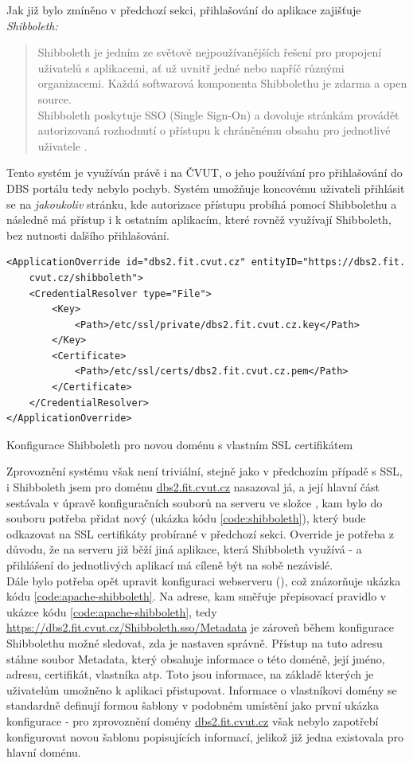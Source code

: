 Jak již bylo zmíněno v předchozí sekci, přihlašování do aplikace zajišťuje \emph{Shibboleth:}
\begin{quote}
Shibboleth je jedním ze světově nejpoužívanějších řešení pro propojení uživatelů s aplikacemi, ať už uvnitř jedné nebo napříč různými organizacemi. Každá softwarová komponenta Shibbolethu je zdarma a open source.\\
Shibboleth poskytuje SSO (Single Sign-On) a dovoluje stránkám provádět autorizovaná rozhodnutí o přístupu k chráněnému obsahu pro jednotlivé uživatele \cite{shibboleth}.
\end{quote}
Tento systém je využíván právě i na ČVUT, o jeho používání pro přihlašování do DBS portálu tedy nebylo pochyb. Systém umožňuje koncovému uživateli přihlásit se na \emph{jakoukoliv} stránku, kde autorizace přístupu probíhá pomocí Shibbolethu a následně má přístup i k ostatním aplikacím, které rovněž využívají Shibboleth, bez nutnosti dalšího přihlašování.\\
\begin{listing}[H]
	\begin{verbatim}
<ApplicationOverride id="dbs2.fit.cvut.cz" entityID="https://dbs2.fit.
    cvut.cz/shibboleth">
    <CredentialResolver type="File">
        <Key>
            <Path>/etc/ssl/private/dbs2.fit.cvut.cz.key</Path>
        </Key>
        <Certificate>
            <Path>/etc/ssl/certs/dbs2.fit.cvut.cz.pem</Path>
        </Certificate>
    </CredentialResolver>
</ApplicationOverride>
	\end{verbatim}
	\caption{Konfigurace Shibboleth pro novou doménu s vlastním SSL certifikátem} \label{code:shibboleth}
\end{listing}
Zprovoznění systému však není triviální, stejně jako v předchozím případě s SSL, i Shibboleth jsem pro doménu \url{dbs2.fit.cvut.cz} nasazoval já, a její hlavní část sestávala v úpravě konfiguračních souborů na serveru ve složce , kam bylo do souboru  potřeba přidat nový  (ukázka kódu \ref{code:shibboleth}), který bude odkazovat na SSL certifikáty probírané v předchozí sekci. Override je potřeba z důvodu, že na serveru již běží jiná aplikace, která Shibboleth využívá -  a přihlášení do jednotlivých aplikací má cíleně být na sobě nezávislé.\\
Dále bylo potřeba opět upravit konfiguraci webserveru (), což znázorňuje ukázka kódu \ref{code:apache-shibboleth}. Na adrese, kam směřuje přepisovací pravidlo v ukázce kódu \ref{code:apache-shibboleth}, tedy \url{https://dbs2.fit.cvut.cz/Shibboleth.sso/Metadata} je zároveň během konfigurace Shibbolethu možné sledovat, zda je nastaven správně. Přístup na tuto adresu stáhne soubor Metadata, který obsahuje informace o této doméně, její jméno, adresu, certifikát, vlastníka atp. Toto jsou informace, na základě kterých je uživatelům umožněno k aplikaci přistupovat. Informace o vlastníkovi domény se standardně definují formou šablony v podobném umístění jako první ukázka konfigurace - pro zprovoznění domény \url{dbs2.fit.cvut.cz} však nebylo zapotřebí konfigurovat novou šablonu popisujících informací, jelikož již jedna existovala pro hlavní doménu.
